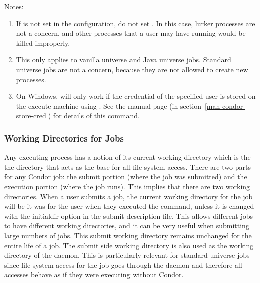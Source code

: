 Notes:
\begin{enumerate}

\item{
If  is not set in the configuration, do not
set .
In this case, lurker processes are not a concern,
and other processes that a user may have running would be killed
improperly.
}

\item{
This only applies to vanilla universe and Java universe jobs.
Standard universe jobs are not a concern,
because they are not allowed to create new processes.
}

\item{
On Windows,  will only work if the credential
of the specified user is stored on the execute machine
using .
See the 
manual page (in section~\ref{man-condor-store-cred}) for details of this command.
}
\end{enumerate}



\subsubsection{\label{sec:DirOfJob}Working Directories for Jobs}

Any executing process has a notion of its current working directory
which is the the directory that acts as the base for all file system
access.  There are two parts for any Condor job: the submit portion
(where the job was submitted) and the execution portion (where the job
runs).  This implies that there are two working directories.  When a
user submits a job, the current working directory for the job will be
it was for the user when they executed the  command,
unless it is changed with the initialdir option in the submit
description file. This allows different jobs to have different working
directories, and it can be very useful when submitting large numbers
of jobs. This submit working directory remains unchanged for the
entire life of a job.  The submit side working directory is also used
as the working directory of the  daemon.  This is
particularly relevant for standard universe jobs since file system
access for the job goes through the  daemon and
therefore all accesses behave as if they were executing without
Condor.

